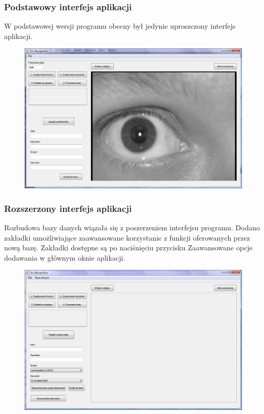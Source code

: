 \documentclass{beamer}
\begin{document}
\begin{frame}
\frametitle{Podstawowy interfejs aplikacji}

W podstawowej wersji programu obecny był jedynie uproszczony interfejs aplikacji.
\begin{figure}
\includegraphics[scale=0.2]{oknoGlowne.jpg}
\end{figure}
\end{frame}

\begin{frame}
\frametitle{Rozszerzony interfejs aplikacji}

Rozbudowa bazy danych wiązała się z poszerzeniem interfejsu programu. Dodano zakładki umożliwiające zaawansowane korzystanie z funkcji oferowanych przez nową bazę. Zakładki dostępne są po naciśnięciu przycisku Zaawansowane opcje dodawania w głównym oknie aplikacji.
\begin{figure}
\includegraphics{okno_glowne.jpg}
\end{figure}

\end{frame}
\end{document}
